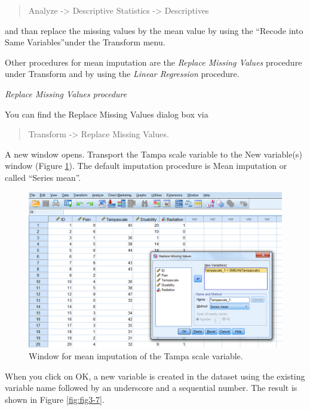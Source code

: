 \documentclass[]{book}
\begin{document}
\begin{quote}
Analyze -\textgreater{} Descriptive Statistics -\textgreater{}
Descriptives
\end{quote}

and than replace the missing values by the mean value by using the
``Recode into Same Variables''under the Transform menu.

Other procedures for mean imputation are the \emph{Replace Missing
Values} procedure under Transform and by using the \emph{Linear
Regression} procedure.

\emph{Replace Missing Values procedure}

You can find the Replace Missing Values dialog box via

\begin{quote}
Transform -\textgreater{} Replace Missing Values.
\end{quote}

A new window opens. Transport the Tampa scale variable to the New
variable(s) window (Figure \ref{fig:fig3-3}). The default imputation
procedure is Mean imputation or called ``Series mean''.

\begin{figure}

{\centering \includegraphics[width=0.7\linewidth]{images/fig3.6} 

}

\caption{Window for mean imputation of the Tampa scale variable.}\label{fig:fig3-3}
\end{figure}

When you click on OK, a new variable is created in the dataset using the
existing variable name followed by an underscore and a sequential
number. The result is shown in Figure \ref{fig:fig3-7}.
\end{document}
